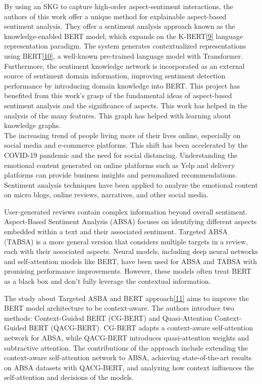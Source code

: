 \documentclass[conference]{IEEEtran}
\begin{document}
	By using an SKG to capture high-order aspect-sentiment interactions, the authors of this work offer a unique method for explainable aspect-based sentiment analysis. They offer a sentiment analysis approach known as the knowledge-enabled BERT model, which expands on the K-BERT\href{https://www.sciencedirect.com/science/article/abs/pii/S0167739X20309195}{[9]} language representation paradigm. The system generates contextualized representations using BERT\href{https://www.sciencedirect.com/science/article/abs/pii/S0957417422021467}{[10]}, a well-known pre-trained language model with Transformer. Furthermore, the sentiment knowledge network is incorporated as an external source of sentiment domain information, improving sentiment detection performance by introducing domain knowledge into BERT. This project has benefited from this work's grasp of the fundamental ideas of aspect-based sentiment analysis and the significance of aspects. This work has helped in the analysis of the many features. This graph has helped with learning about knowledge graphs.\\
	

	The increasing trend of people living more of their lives online, especially on social media and e-commerce platforms. This shift has been accelerated by the COVID-19 pandemic and the need for social distancing. Understanding the emotional content generated on online platforms such as Yelp and delivery platforms can provide business insights and personalized recommendations. Sentiment analysis techniques have been applied to analyze the emotional content on micro blogs, online reviews, narratives, and other social media. 

	User-generated reviews contain complex information beyond overall sentiment. Aspect-Based Sentiment Analysis (ABSA) focuses on identifying different aspects embedded within a text and their associated sentiment. Targeted ABSA (TABSA) is a more general version that considers multiple targets in a review, each with their associated aspects. Neural models, including deep neural networks and self-attention models like BERT, have been used for ABSA and TABSA with promising performance improvements. However, these models often treat BERT as a black box and don't fully leverage the contextual information. 

	The study about Targeted ASBA and BERT approach\href{https://arxiv.org/pdf/2010.07523.pdf}{[11]} aims to improve the BERT model architecture to be context-aware. The authors introduce two methods: Context-Guided BERT (CG-BERT) and Quasi-Attention Context-Guided BERT (QACG-BERT). CG-BERT adapts a context-aware self-attention network for ABSA, while QACG-BERT introduces quasi-attention weights and subtractive attention. The contributions of the approach include extending the context-aware self-attention network to ABSA, achieving state-of-the-art results on ABSA datasets with QACG-BERT, and analyzing how context influences the self-attention and decisions of the models.
	
\end{document}
